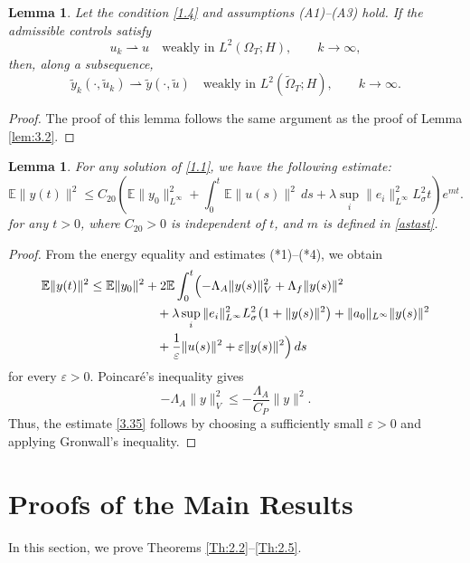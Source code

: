 \documentclass[a4paper,12pt]{article}
\newtheorem{lemma}[definition]{Lemma}
\numberwithin{equation}{section}
\newcommand{\ve}{{\varepsilon}}
\def\ve{\varepsilon}
\begin{document}
\begin{lemma}\label{lem:3.4}
Let the condition \eqref{1.4} and assumptions \textnormal{(A1)--(A3)}
hold. If the admissible controls satisfy
\[
u_k \rightharpoonup u
\quad\text{weakly in }L^2(\Omega_T;H),
\qquad k\to\infty,
\]
then, along a subsequence,
\[
\widetilde{y}_k(\cdot,\widetilde{u}_k)
\rightharpoonup
\widetilde{y}(\cdot,\widetilde{u})
\quad\text{weakly in }
L^2(\widetilde{\Omega}_T;H),
\qquad k\to\infty.
\]
\end{lemma}

\begin{proof}
The proof of this lemma follows the same argument as the proof of
Lemma \ref{lem:3.2}.
\end{proof}
\begin{lemma}\label{lem:3.5}
For any solution of \eqref{1.1}, we have the following estimate:
\begin{equation}
\mathbb{E}\|y(t)\|^2
\leq
C_{20}
\left(
\mathbb{E}\|y_0\|_{L^{\infty}}^2 
+
\int_0^t
\mathbb{E}\|u(s)\|^2\,ds
+ \lambda \sup_{i}\|e_i\|_{L^\infty}^2 L_{\sigma}^2 t \right) e^{mt}.
\label{3.35}
\end{equation}
for any $t>0$, where $C_{20}>0$ is independent of $t$, and $m$
is defined in \eqref{astast}.
\end{lemma}

\begin{proof}
From the energy equality and estimates \textnormal{(*1)--(*4)}, we
obtain
\[
\begin{aligned}
\mathbb{E}\|y(t)\|^2
\leq{}&
\mathbb{E}\|y_0\|^2
+
2\mathbb{E}\int_0^t
\Bigl(
-\Lambda_A\|y(s)\|_V^2
+\Lambda_f\|y(s)\|^2
\\
&\qquad\qquad
+\lambda\sup_i\|e_i\|_{L^\infty}^2
L_\sigma^2\bigl(1+\|y(s)\|^2\bigr)
+\|a_0\|_{L^\infty}\|y(s)\|^2
\\
&\qquad\qquad
+\frac{1}{\ve}\|u(s)\|^2
+\varepsilon\|y(s)\|^2
\Bigr)\,ds
\end{aligned}
\]
for every $\varepsilon>0$.  Poincaré's inequality
gives
\[
-\Lambda_A\|y\|_V^2
\leq
-\frac{\Lambda_A}{C_P}\|y\|^2.
\]
Thus, the estimate \eqref{3.35} follows by choosing a sufficiently small
$\varepsilon>0$ and applying Gronwall's inequality.
\end{proof}

\section{Proofs of the Main Results}\label{Sec:4}

In this section, we prove Theorems \ref{Th:2.2}--\ref{Th:2.5}.
\end{document}
